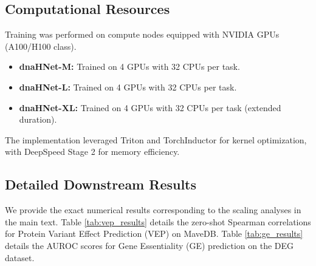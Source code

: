 \documentclass{article}
\theoremstyle{plain}
\theoremstyle{definition}
\theoremstyle{remark}
\begin{document}
\subsection{Computational Resources}
Training was performed on compute nodes equipped with NVIDIA GPUs (A100/H100 class). 
\begin{itemize}
    \item \textbf{dnaHNet-M:} Trained on 4 GPUs with 32 CPUs per task.
    \item \textbf{dnaHNet-L:} Trained on 4 GPUs with 32 CPUs per task.
    \item \textbf{dnaHNet-XL:} Trained on 4 GPUs with 32 CPUs per task (extended duration).
\end{itemize}
The implementation leveraged Triton and TorchInductor for kernel optimization, with DeepSpeed Stage 2 for memory efficiency.
\subsection{Detailed Downstream Results}
\label{app:downstream_results}

We provide the exact numerical results corresponding to the scaling analyses in the main text. Table \ref{tab:vep_results} details the zero-shot Spearman correlations for Protein Variant Effect Prediction (VEP) on MaveDB. Table \ref{tab:ge_results} details the AUROC scores for Gene Essentiality (GE) prediction on the DEG dataset.
\end{document}
